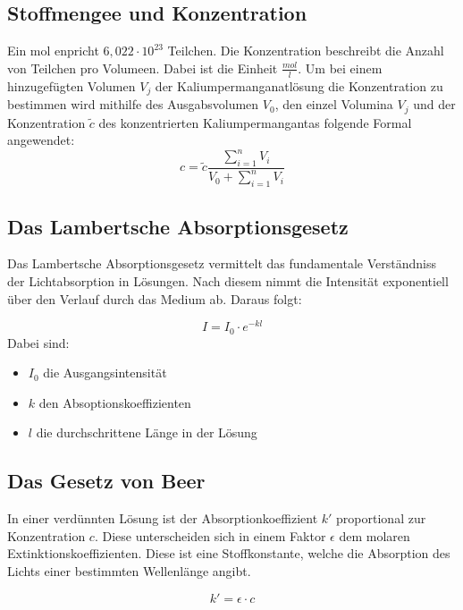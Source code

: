 \subsection{Stoffmengee und Konzentration}
Ein mol enpricht $6,022 \cdot 10^{23}$ Teilchen. Die Konzentration beschreibt die Anzahl von
Teilchen pro Volumeen. Dabei ist die Einheit $\tfrac{mol}{l}$.
Um bei einem hinzugefügten Volumen $V_j$ der Kaliumpermanganatlösung die Konzentration
zu bestimmen wird mithilfe des Ausgabsvolumen $V_0$, den einzel Volumina $V_j$ und der 
Konzentration $\tilde{c}$ des konzentrierten Kaliumpermangantas folgende Formal angewendet:
\begin{equation}
    c = \tilde{c} \frac{\sum_{i=1}^n V_i}{V_0 + \sum_{i=1}^n V_i}
    \label{eq:Konzentration}
\end{equation}

\subsection{Das Lambertsche Absorptionsgesetz}
Das Lambertsche Absorptionsgesetz vermittelt das fundamentale Verständniss der Lichtabsorption
in Lösungen. Nach diesem nimmt die Intensität exponentiell über den Verlauf durch das Medium ab.
Daraus folgt:

\begin{equation}
    I = I_0 \cdot e^{-kl}
\end{equation}
Dabei sind:
\begin{itemize}
    \item $I_0$ die Ausgangsintensität
    \item $k$ den Absoptionskoeffizienten
    \item $l$ die durchschrittene Länge in der Lösung
\end{itemize}


\subsection{Das Gesetz von Beer}
In einer verdünnten Lösung ist der Absorptionkoeffizient $k'$ proportional zur Konzentration $c$.
Diese unterscheiden sich in einem Faktor $\epsilon$ dem molaren Extinktionskoeffizienten. Diese
ist eine Stoffkonstante, welche die Absorption des Lichts einer bestimmten Wellenlänge angibt.

\begin{equation}
    k' = \epsilon \cdot c
    \label{eq:dekAbsorp}
\end{equation}

